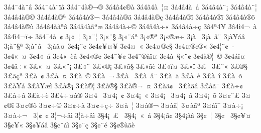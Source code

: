 {3^^e14^^af4^^e0^^a8^^e2^^ad
3^^e14^^af4^^e0^^a8^^ef^^e2
3^^e14^^af4^^e0^^ae^^ac^^ae
3^^e14^^e24^^a2^^ae^^e0
3^^e14^^e24^^e0^^a0^^a6^^a4
3^^e14^^e24^^e0^^a0^^e5
3^^e14^^e24^^e0^^a8^^a1
3^^e14^^e24^^e0^^a8^^a6
3^^e14^^e24^^e0^^ae^^a9
3^^e14^^e24^^e0^^ae^^aa
3^^e14^^e24^^e0^^ae^^ac
3^^e14^^e24^^e0^^ae^^e4
3^^e14^^e24^^e0^^ae^^e7
3^^e14^^e24^^e0^^ae^^ee
3^^e14^^e24^^e0^^ae^^ef
3^^e14^^e24^^e0^^ae^^f5
3^^e14^^e24^^e0^^ae^^f9
3^^e14^^e24^^e0^^e3^^aa^^e2
3^^e14^^e24^^e0^^e3^^aa^^e6
3^^e14^^e24^^e0^^f7^^a9
3^^e14^^e24^^e0^^f7^^ab
3^^e14^^e24^^e0^^f7^^e7
3^^e24^^aa4^^ad^^a5^^ad
3^^e24^^ec4^^ac^^a0^^e0
3^^e24^^ec4^^ac^^ef^^ad^^f7
3^^e34^^af4^^e0^^a0^^a2
3^^a1^^ab^^a0^^a6
3^^a1^^ab^^a8^^a6
3^^a1^^ab^^a8^^a7
3^^a1^^ab^^a8^^e1^^aa
3^^a1^^ab^^ae^^aa
3^^a1^^ab^^ae^^e6^^f7
3^^a1^^e0^^a0^^ad
3^^a1^^e0^^a0^^e2^^a8
3^^a1^^e0^^a5^^e1^^e2
3^^a1^^e0^^a8^^a7^^aa
3^^a1^^e0^^a8^^e2^^a0^^ad
3^^a1^^e0^^e3^^a4
3^^a24^^a1^^a8^^a2
3^^a24^^a2^^a5^^a4^^a5^^ad
3^^a24^^a4^^a0^^ab
3^^a24^^a4^^ae^^a2^^a7
3^^a24^^a4^^ae^^a2^^ae^^ab
3^^a24^^a6^^a8^^a2^^a0^^ad
3^^a24^^ab^^a0^^a4
3^^a24^^ab^^a0^^e1^^ad
3^^a24^^ab^^a0^^e8^^e2
3^^a24^^ab^^ae^^a2   
3^^a24^^af^^a5^^a2^^ad
3^^a24^^af^^ae^^e0^^ef^^a4
3^^a24^^e0^^a0^^a7^^ab^^a8^^a2
3^^a24^^e0^^ae^^a6^^a0^^a9
3^^a24^^e1^^ee^^a4
3^^a24^^e2^^f7^^ab
3^^a3^^ab^^a0^^a4
3^^a3^^ab^^a8^^a1
3^^a3^^ab^^a8^^ad
3^^a3^^ab^^ae^^a1
3^^a3^^ab^^e3^^a7
3^^a3^^ab^^e3^^e8
3^^a3^^ab^^ef^^a4
3^^a3^^ab^^ef^^ad
3^^a3^^ad^^a0^^ad
3^^a3^^ad^^a8^^ab
3^^a3^^ad^^ae^^a7
3^^a3^^ad^^e3^^e7^^aa
3^^a3^^e0^^a0^^a2
3^^a3^^e0^^a0^^a4
3^^a3^^e0^^a0^^a9
3^^a3^^e0^^a0^^ac
3^^a3^^e0^^a0^^ad
3^^a3^^e0^^a0^^e2^^a8
3^^a3^^e0^^a0^^e4
3^^a3^^e0^^a0^^e8
3^^a3^^e0^^a0^^ee
3^^a3^^e0^^a0^^f5
3^^a3^^e0^^a5^^e1
3^^a3^^e0^^a5^^e6^^ec
3^^a3^^e0^^ae^^a1
3^^a3^^e0^^ae^^a6
3^^a3^^e0^^ae^^a7
3^^a3^^e0^^ae^^ac^^a0^^a4
3^^a3^^e0^^e3^^a2^^a0^^ad
3^^a3^^e0^^e3^^ad^^e2
3^^a3^^e0^^e3^^af
3^^a3^^e0^^f7^^a2
3^^a3^^e0^^f7^^e2
3^^a3^^e0^^f7^^e8
3^^a34^^f7^^a4^^e0^^ae
3^^a44^^a0^^ad
3^^a44^^a1^^a0^^a2
3^^a44^^a1^^a0^^ab
3^^a44^^a1^^a0^^ad
3^^a44^^a1^^a0^^e2
3^^a44^^a1^^a0^^f5
3^^a4^^a2^^a8^^a3
3^^a4^^a2^^ae^^ee
3^^a4^^a2^^ae^^f5
3^^a4^^a2^^f7^^a9
3^^a4^^a2^^f7^^e0
3^^a4^^a2^^f7^^e7^^f7
3^^a4^^e0^^a0^^a6
3^^a4^^e0^^ae^^ac
3^^a4^^e0^^e3^^a6
3^^a4^^e0^^e3^^aa
3^^a4^^e0^^ef^^af
3^^a4^^e0^^f7^^a1
3^^a4^^e0^^f7^^ac^^a0
3^^a6^^a2^^a0^^a2
3^^a6^^ac^^f7^^e2^^ec
3^^a6^^e0^^f7^^e2^^ec
3^^a74^^a1^^a0^^a3^^a0
3^^a74^^a1^^a0^^ab^^a0^^ad^^e1
3^^a74^^a1^^e3^^a2
3^^a74^^a1^^e3^^e2
3^^a7^^a2^^a0^^a6
3^^a7^^a2^^a0^^ad
3^^a7^^a2^^a5^^a4
3^^a7^^a2^^a5^^ab
3^^a7^^a2^^a5^^e1^^e2
3^^a7^^a2^^a8^^e1^^ec 
3^^a7^^a2^^a8^^e7
3^^a7^^a2^^a8^^e9
3^^a7^^a2^^ae^^e0^^e3^^e8
}
